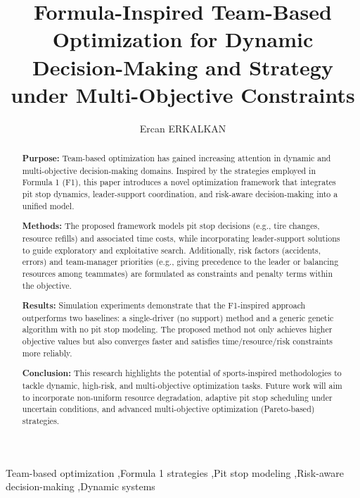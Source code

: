 \documentclass[preprint,12pt]{elsarticle}
\begin{document}
\begin{frontmatter}

\title{Formula-Inspired Team-Based Optimization for Dynamic Decision-Making and Strategy under Multi-Objective Constraints}

\author{Ercan ERKALKAN}

\begin{abstract}
\textbf{Purpose:} Team-based optimization has gained increasing attention in dynamic and multi-objective decision-making domains. Inspired by the strategies employed in Formula 1 (F1), this paper introduces a novel optimization framework that integrates pit stop dynamics, leader-support coordination, and risk-aware decision-making into a unified model.

\textbf{Methods:} The proposed framework models pit stop decisions (e.g., tire changes, resource refills) and associated time costs, while incorporating leader-support solutions to guide exploratory and exploitative search. Additionally, risk factors (accidents, errors) and team-manager priorities (e.g., giving precedence to the leader or balancing resources among teammates) are formulated as constraints and penalty terms within the objective.

\textbf{Results:} Simulation experiments demonstrate that the F1-inspired approach outperforms two baselines: a single-driver (no support) method and a generic genetic algorithm with no pit stop modeling. The proposed method not only achieves higher objective values but also converges faster and satisfies time/resource/risk constraints more reliably.

\textbf{Conclusion:} This research highlights the potential of sports-inspired methodologies to tackle dynamic, high-risk, and multi-objective optimization tasks. Future work will aim to incorporate non-uniform resource degradation, adaptive pit stop scheduling under uncertain conditions, and advanced multi-objective optimization (Pareto-based) strategies.
\end{abstract}

\begin{keyword}
Team-based optimization \sep Formula 1 strategies \sep Pit stop modeling \sep Risk-aware decision-making \sep Dynamic systems
\end{keyword}

\end{frontmatter}
\end{document}
